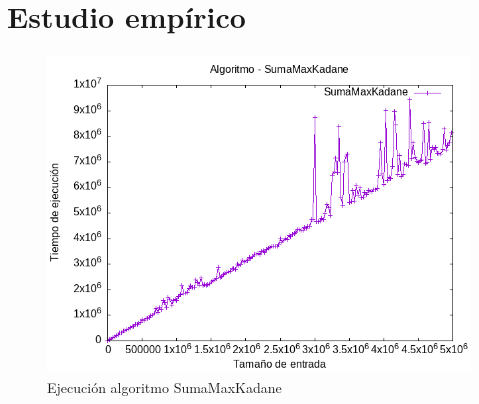 \documentclass[11pt,openany]{book}
\begin{document}
  \section*{Estudio empírico}
  \begin{figure}[h]
        \begin{minipage}{0.5\textwidth}
            \centering
            \includegraphics[width=\linewidth]{../Codigos/Graficas/SumaMaxKadane.png}
            \caption{Ejecución algoritmo SumaMaxKadane}
            \label{fig:SumaMaxKadane}
        \end{minipage}
  \end{figure}
\end{document}
